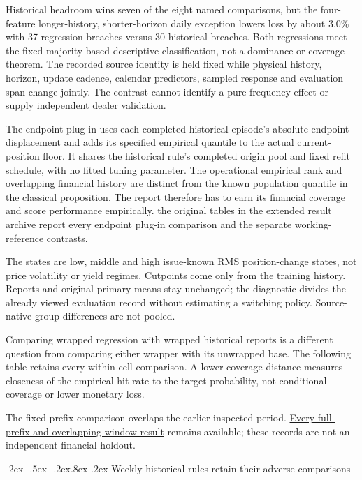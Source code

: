 \documentclass[10pt,a4paper]{article}
\makeatletter
\renewcommand\section{\@startsection{section}{1}{\z@}%
  {-2ex \@plus -.5ex \@minus -.2ex}{.8ex \@plus .2ex}%
  {\normalfont\large\bfseries}}
\makeatother
\begin{document}
Historical headroom wins seven of the eight named comparisons, but the
four-feature longer-history, shorter-horizon daily exception lowers loss by
about 3.0\% with 37 regression breaches versus 30 historical breaches.
Both regressions meet the fixed majority-based descriptive classification,
not a dominance or coverage theorem. The recorded source identity is held fixed while physical history, horizon, update cadence, calendar predictors, sampled response and evaluation span change jointly. The contrast cannot
identify a pure frequency effect or supply independent dealer validation.

The endpoint plug-in uses each completed historical episode's
absolute endpoint displacement and adds its specified empirical quantile to
the actual current-position floor. It shares the historical rule's completed
origin pool and fixed refit schedule, with no fitted tuning parameter.
The operational empirical rank and overlapping financial history are distinct
from the known population quantile in the classical proposition. The report
therefore has to earn its financial coverage and score performance empirically.
the original tables in the extended result archive report every endpoint plug-in comparison and the separate working-reference contrasts.

The states are low, middle and high issue-known RMS position-change
states, not price volatility or yield regimes. Cutpoints come only from the
training history. Reports and original primary means stay unchanged; the
diagnostic divides the already viewed evaluation record without estimating a
switching policy. Source-native group differences are not pooled.

Comparing wrapped regression with wrapped historical reports is a
different question from comparing either wrapper with its unwrapped base.
The following table retains every within-cell comparison. A lower coverage distance measures closeness of the empirical hit rate to the target probability, not conditional coverage or lower monetary loss.

The fixed-prefix comparison overlaps the earlier inspected period. \href{https://github.com/ByronLi0207/financial-mathematics-paper-20261020/blob/submission-final/EXTENDED_RESULTS.md#asmbi-extended-s26}{Every full-prefix and overlapping-window result} remains available; these records are not an independent financial holdout.

\FloatBarrier


\section{Weekly historical rules retain their adverse comparisons}\label{sup:panel}\label{sup:panel-second}\label{sup:panel-levy}\label{sup:selection}\label{sup:selection-failures}
\end{document}
